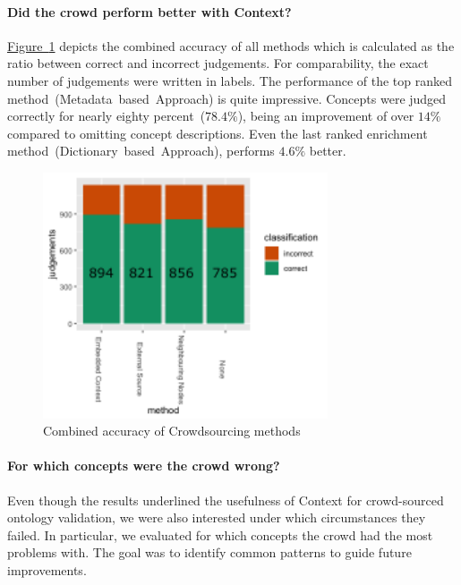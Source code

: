 \paragraph{Did the crowd perform better with Context?}
\hyperref[fig:results_accuracy_combined]{Figure~\ref*{fig:results_accuracy_combined}} depicts the combined accuracy of all methods which is calculated
as the ratio between correct and incorrect judgements. For comparability, the exact number of judgements were written in labels. The performance of the top ranked method~(Metadata~based~Approach) is quite impressive. Concepts were judged correctly for nearly eighty percent~($78.4\%$), being an improvement of over $14\%$ compared to omitting concept descriptions. Even the last ranked enrichment method~(Dictionary~based~Approach), performs $4.6\%$ better.
\begin{figure}
	 \centering
	 \includegraphics[width=0.75\textwidth]{plots/comparison/barplot_all_judgements}
	 \caption{Combined accuracy of Crowdsourcing methods}\label{fig:results_accuracy_combined}
\end{figure}

\paragraph{For which concepts were the crowd wrong?}
Even though the results underlined the usefulness of Context for crowd-sourced ontology validation, we were also interested under which circumstances they failed. In particular, we evaluated for which concepts the crowd had the most problems with. The goal was to identify common patterns to guide future improvements. 

